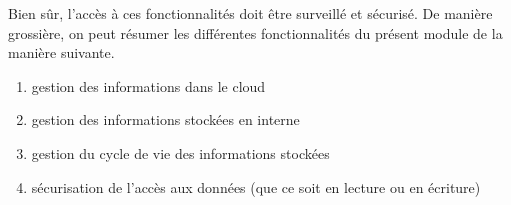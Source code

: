 Bien sûr, l'accès à ces fonctionnalités doit être surveillé et sécurisé. De manière grossière, on peut résumer les différentes
fonctionnalités du présent module de la manière suivante.
\begin{enumerate}
    \item gestion des informations dans le cloud
    \item gestion des informations stockées en interne
    \item gestion du cycle de vie des informations stockées
    \item sécurisation de l'accès aux données (que ce soit en lecture ou en écriture)
\end{enumerate}
